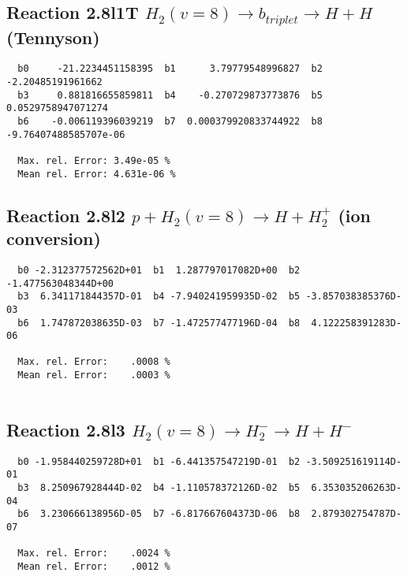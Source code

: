\documentclass[12pt]{article}
\begin{document}
\subsection{
Reaction 2.8l1T
$  H_2(v=8) \rightarrow b_{triplet}\rightarrow H + H $ (Tennyson)
}


\begin{small}\begin{verbatim}
  b0     -21.2234451158395  b1      3.79779548996827  b2     -2.20485191961662
  b3     0.881816655859811  b4    -0.270729873773876  b5    0.0529758947071274
  b6    -0.006119396039219  b7  0.000379920833744922  b8 -9.76407488585707e-06

  Max. rel. Error: 3.49e-05 %
  Mean rel. Error: 4.631e-06 %
\end{verbatim}\end{small}


\subsection{
Reaction 2.8l2
$ p + H_2(v=8) \rightarrow H + H_2^+$ (ion conversion)
}


\begin{small}\begin{verbatim}
  b0 -2.312377572562D+01  b1  1.287797017082D+00  b2 -1.477563048344D+00
  b3  6.341171844357D-01  b4 -7.940241959935D-02  b5 -3.857038385376D-03
  b6  1.747872038635D-03  b7 -1.472577477196D-04  b8  4.122258391283D-06

  Max. rel. Error:    .0008 %
  Mean rel. Error:    .0003 %


\end{verbatim}\end{small}


\subsection{
Reaction 2.8l3
 $ H_2(v=8) \rightarrow H_2^- \rightarrow H + H^-$
}


\begin{small}\begin{verbatim}
  b0 -1.958440259728D+01  b1 -6.441357547219D-01  b2 -3.509251619114D-01
  b3  8.250967928444D-02  b4 -1.110578372126D-02  b5  6.353035206263D-04
  b6  3.230666138956D-05  b7 -6.817667604373D-06  b8  2.879302754787D-07

  Max. rel. Error:    .0024 %
  Mean rel. Error:    .0012 %


\end{verbatim}\end{small}
\end{document}
